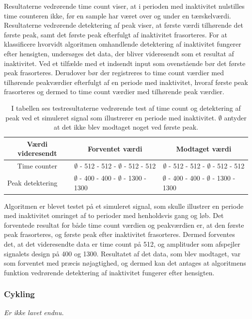 Resultaterne vedrørende time count viser, at i perioden med inaktivitet nulstilles time counteren ikke, før en sample har været over og under en tærskelværdi. Resultaterne vedrørende detektering af peak viser, at første værdi tilhørende det første peak, samt det første peak efterfulgt af inaktivitet frasorteres. For at klassificere hvorvidt algoritmen omhandlende detektering af inaktivitet fungerer efter hensigten, undersøges det data, der bliver videresendt som et resultat af inaktivitet. Ved et tilfælde med et indsendt input som ovenstående bør det første peak frasorteres. Derudover bør der registreres to time count værdier med tilhørende peakværdier efterfulgt af en periode med inaktivitet, hvoraf første peak frasorteres og dermed to time count værdier med tilhørende peak værdier.
\begin{table}[H]
	\centering
	\begin{tabular}{ccc}
		\hline
		\rowcolor[HTML]{C0C0C0} 
		Værdi videresendt & Forventet værdi & Modtaget værdi \\ \hline
		Time counter & $\emptyset$ - 512 - 512 - $\emptyset$ - 512 - 512 & $\emptyset$ - 512 - 512 - $\emptyset$ - 512 - 512 \\ \hline
		\multicolumn{1}{l}{Peak detektering} & \multicolumn{1}{l}{$\emptyset$ - 400 - 400 - $\emptyset$ - 1300 - 1300} & \multicolumn{1}{l}{$\emptyset$ - 400 - 400 - $\emptyset$ - 1300 - 1300} \\ \hline
	\end{tabular}
	\caption{I tabellen ses testresultaterne vedrørende test af time count og detektering af peak ved et simuleret signal som illustrerer en periode med inaktivitet. $\emptyset$ antyder at det ikke blev modtaget noget ved første peak.}
	\label{tab:test_inaktiv}
\end{table}\vspace{-0.5cm}
Algoritmen er blevet testet på et simuleret signal, som skulle illustrer en periode med inaktivitet omringet af to perioder med henholdsvis gang og løb. Det forventede resultat for både time count værdien og peakværdien er, at den første peak frasorteres, og første peak efter inaktivitet frasorteres. Dermed forventes det, at det videresendte data er time count på 512, og amplituder som afspejler signalets design på 400 og 1300. Resultatet af det data, som blev modtaget, var som forventet med præcis nøjagtighed, og dermed kan det antages at algoritmens funktion vedrørende detektering af inaktivitet fungerer efter hensigten. 

\subsubsection{Cykling}
\textit{Er ikke lavet endnu.}

